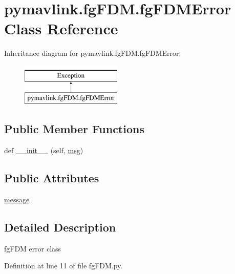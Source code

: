 \hypertarget{classpymavlink_1_1fgFDM_1_1fgFDMError}{}\section{pymavlink.\+fg\+F\+D\+M.\+fg\+F\+D\+M\+Error Class Reference}
\label{classpymavlink_1_1fgFDM_1_1fgFDMError}
Inheritance diagram for pymavlink.\+fg\+F\+D\+M.\+fg\+F\+D\+M\+Error\+:\begin{figure}[H]
\begin{center}
\leavevmode
\includegraphics[height=2.000000cm]{classpymavlink_1_1fgFDM_1_1fgFDMError}
\end{center}
\end{figure}
\subsection*{Public Member Functions}
\begin{DoxyCompactItemize}
\item 
def \mbox{\hyperlink{classpymavlink_1_1fgFDM_1_1fgFDMError_aa043a6d539a9fbe255bb48dc1c80fc42}{\+\_\+\+\_\+init\+\_\+\+\_\+}} (self, \mbox{\hyperlink{stratnode_8cpp_a82cfe4ed9bc9e1b07c8bf209c324d85b}{msg}})
\end{DoxyCompactItemize}
\subsection*{Public Attributes}
\begin{DoxyCompactItemize}
\item 
\mbox{\hyperlink{classpymavlink_1_1fgFDM_1_1fgFDMError_aeab57dd000a7c9c7848444bc5c3c9392}{message}}
\end{DoxyCompactItemize}


\subsection{Detailed Description}
\begin{DoxyVerb}fgFDM error class\end{DoxyVerb}
 

Definition at line 11 of file fg\+F\+D\+M.\+py.



